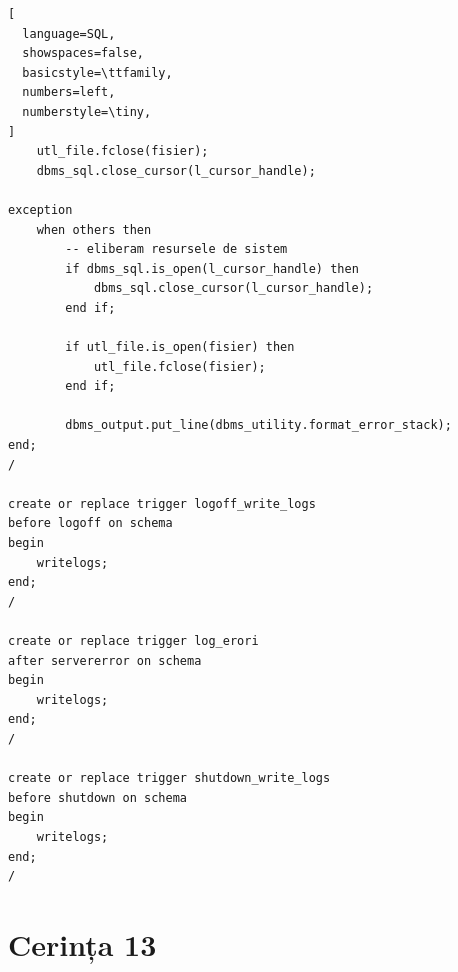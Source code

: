 \documentclass[12pt]{article}
\begin{document}
\begin{lstlisting}[
  language=SQL,
  showspaces=false,
  basicstyle=\ttfamily,
  numbers=left,
  numberstyle=\tiny,
]
    utl_file.fclose(fisier);
    dbms_sql.close_cursor(l_cursor_handle);
    
exception
    when others then
        -- eliberam resursele de sistem
        if dbms_sql.is_open(l_cursor_handle) then
            dbms_sql.close_cursor(l_cursor_handle);
        end if;
        
        if utl_file.is_open(fisier) then
            utl_file.fclose(fisier);
        end if;
        
        dbms_output.put_line(dbms_utility.format_error_stack);
end;
/

create or replace trigger logoff_write_logs
before logoff on schema
begin
    writelogs;
end;
/

create or replace trigger log_erori
after servererror on schema
begin
    writelogs;
end;
/

create or replace trigger shutdown_write_logs
before shutdown on schema
begin
    writelogs;
end;
/
\end{lstlisting}

\pagebreak

\section{Cerința 13}

\vspace{0.5em}
\end{document}
